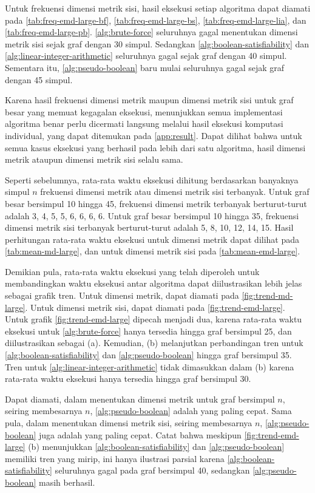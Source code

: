 Untuk frekuensi dimensi metrik sisi, hasil eksekusi setiap algoritma dapat diamati pada \autoref{tab:freq-emd-large-bf}, \autoref{tab:freq-emd-large-bs}, \autoref{tab:freq-emd-large-lia}, dan \autoref{tab:freq-emd-large-pb}. \autoref{alg:brute-force} seluruhnya gagal menentukan dimensi metrik sisi sejak graf dengan 30 simpul. Sedangkan \autoref{alg:boolean-satisfiability} dan \autoref{alg:linear-integer-arithmetic} seluruhnya gagal sejak graf dengan 40 simpul. Sementara itu, \autoref{alg:pseudo-boolean} baru mulai seluruhnya gagal sejak graf dengan 45 simpul.

Karena hasil frekuensi dimensi metrik maupun dimensi metrik sisi untuk graf besar yang memuat kegagalan eksekusi, menunjukkan semua implementasi algoritma benar perlu dicermati langsung melalui hasil eksekusi komputasi individual, yang dapat ditemukan pada \cref{app:result}. Dapat dilihat bahwa untuk semua kasus eksekusi yang berhasil pada lebih dari satu algoritma, hasil dimensi metrik ataupun dimensi metrik sisi selalu sama.

Seperti sebelumnya, rata-rata waktu eksekusi dihitung berdasarkan banyaknya simpul \(n\) frekuensi dimensi metrik atau dimensi metrik sisi terbanyak. Untuk graf besar bersimpul 10 hingga 45, frekuensi dimensi metrik terbanyak berturut-turut adalah 3, 4, 5, 5, 6, 6, 6, 6. Untuk graf besar bersimpul 10 hingga 35, frekuensi dimensi metrik sisi terbanyak berturut-turut adalah 5, 8, 10, 12, 14, 15. Hasil perhitungan rata-rata waktu eksekusi untuk dimensi metrik dapat dilihat pada \autoref{tab:mean-md-large}, dan untuk dimensi metrik sisi pada \autoref{tab:mean-emd-large}.

Demikian pula, rata-rata waktu eksekusi yang telah diperoleh untuk membandingkan waktu eksekusi antar algoritma dapat diilustrasikan lebih jelas sebagai grafik tren. Untuk dimensi metrik, dapat diamati pada \autoref{fig:trend-md-large}. Untuk dimensi metrik sisi, dapat diamati pada \autoref{fig:trend-emd-large}. Untuk grafik \autoref{fig:trend-emd-large} dipecah menjadi dua, karena rata-rata waktu eksekusi untuk \autoref{alg:brute-force} hanya tersedia hingga graf bersimpul 25, dan diilustrasikan sebagai (a). Kemudian, (b) melanjutkan perbandingan tren untuk \autoref{alg:boolean-satisfiability} dan \autoref{alg:pseudo-boolean} hingga graf bersimpul 35. Tren untuk \autoref{alg:linear-integer-arithmetic} tidak dimasukkan dalam (b) karena rata-rata waktu eksekusi hanya tersedia hingga graf bersimpul 30.

Dapat diamati, dalam menentukan dimensi metrik untuk graf bersimpul \(n\), seiring membesarnya \(n\), \autoref{alg:pseudo-boolean} adalah yang paling cepat. Sama pula, dalam menentukan dimensi metrik sisi, seiring membesarnya \(n\), \autoref{alg:pseudo-boolean} juga adalah yang paling cepat. Catat bahwa meskipun \autoref{fig:trend-emd-large} (b) menunjukkan \autoref{alg:boolean-satisfiability} dan \autoref{alg:pseudo-boolean} memiliki tren yang mirip, ini hanya ilustrasi parsial karena \autoref{alg:boolean-satisfiability} seluruhnya gagal pada graf bersimpul 40, sedangkan \autoref{alg:pseudo-boolean} masih berhasil.

